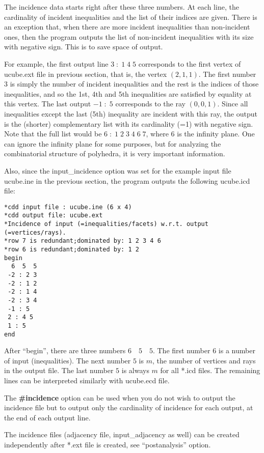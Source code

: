 \documentclass[11pt]{article}
\begin{document}
\begin{description}
The incidence data starts right after these three numbers.
At each line, the cardinality of incident inequalities and
the list of their indices are given.  There is an exception that, when
there are more incident inequalities than non-incident ones, then the program
outputs the list of non-incident inequalities with its
size with negative sign.  This is to save space of output.

For example, the first output line $3 \; : \; 1 \; 4 \; 5$ 
corresponds to the
first vertex of ucube.ext file in previous section, that is, 
the vertex $(2, 1, 1)$.  The first number $3$ is simply the number
of incident inequalities and the rest is the indices of
those inequalities, and so the 1st, 4th and 5th inequalities are
satisfied by equality at this vertex.   The last output
$-1 \; : \; 5$ corresponds to the ray  $(0,0,1)$.  Since all inequalities
except the last (5th) inequality are incident with this ray,
the output is the  (shorter) complementary list with its cardinality (=1) with negative
sign.  Note that the full list would be $6 \; : \; 1 \; 2 \; 3 \; 4 \; 6 \; 7$, where
$6$ is the infinity plane.  One can ignore the infinity
plane for some purposes,  but for analyzing the combinatorial 
structure of polyhedra, it is
very important information.

Also, since the input\_incidence option was set for the example input file ucube.ine in
the previous section, the program outputs the following ucube.icd file:
\begin{verbatim}
*cdd input file : ucube.ine (6 x 4)
*cdd output file: ucube.ext
*Incidence of input (=inequalities/facets) w.r.t. output (=vertices/rays).
*row 7 is redundant;dominated by: 1 2 3 4 6
*row 6 is redundant;dominated by: 1 2
begin
  6  5  5
 -2 : 2 3
 -2 : 1 2
 -2 : 1 4
 -2 : 3 4
 -1 : 5
 2 : 4 5
 1 : 5
end
\end{verbatim}
After ``begin'', there are three numbers $6 \quad 5 \quad 5$.
The first number $6$ is a number of input (inequalities).
The next number $5$ is $m$, the number of vertices and rays in the output file.
The last number $5$ is always  $m$ for all *.icd files.  The remaining
lines can be interpreted similarly with ucube.ecd file.

The {\bf \#incidence} option can be used when you do not wish
to output the incidence file but to output only the cardinality of incidence
for each output, at the end of each output line.

The incidence files (adjacency file, input\_adjacency as well) 
can be created independently
after *.ext file is created, see ``postanalysis'' option. 
 

\end{description}
\end{document}
